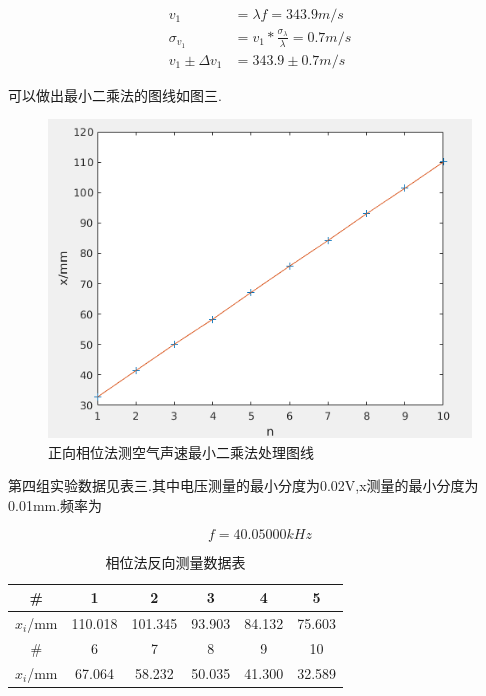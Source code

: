 \documentclass[a4paper,10pt,notitlepage]{article}
\begin{document}
\begin{align}
	v_1 &= \lambda f = 343.9 m/s \\
	\sigma_{v_1} &= v_1 * \frac{\sigma_{\lambda}}{\lambda} = 0.7m/s \\
	v_1 \pm \Delta v_1 &= 343.9 \pm 0.7m/s
\end{align}

	可以做出最小二乘法的图线如图三.
	
\begin{figure}[h]
	\includegraphics[scale=0.6]{f3.png}
	\caption{正向相位法测空气声速最小二乘法处理图线}
\end{figure}

	第四组实验数据见表三.其中电压测量的最小分度为0.02V,x测量的最小分度为0.01mm.频率为
	
\begin{equation}
	f = 40.05000 kHz
\end{equation}

\begin{table}[htbp]
\centering

	\begin{tabular}{|c|c|c|c|c|c|}
	\hline
	\# & 1 & 2 & 3 & 4 & 5 \\
	\hline
	$x_{i}$/mm & 110.018 & 101.345 & 93.903 & 84.132 & 75.603 \\
	\hline
	\# & 6 & 7 & 8 & 9 & 10 \\
	\hline
	$x_{i}$/mm & 67.064 & 58.232 & 50.035 & 41.300 & 32.589 \\
	\hline
	\end{tabular}
	\caption{相位法反向测量数据表}

\end{table}
\end{document}
